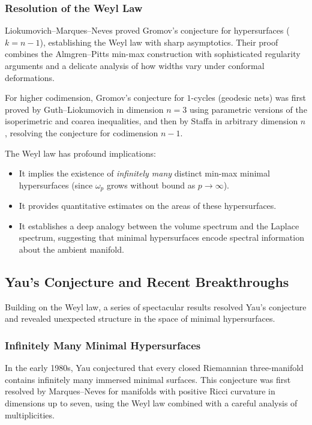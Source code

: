 \subsubsection{Resolution of the Weyl Law}

Liokumovich--Marques--Neves \cite{LMN} proved Gromov's conjecture for hypersurfaces ($k = n-1$),
establishing the Weyl law with sharp asymptotics. Their proof combines the Almgren--Pitts min-max
construction with sophisticated regularity arguments and a delicate analysis of how widths vary
under conformal deformations.

For higher codimension, Gromov's conjecture for $1$-cycles (geodesic nets) was first proved by
Guth--Liokumovich \cite{GL22} in dimension $n=3$ using parametric versions of the isoperimetric
and coarea inequalities, and then by Staffa \cite{Sta-Weyl,Sta-Coarea} in arbitrary dimension $n$,
resolving the conjecture for codimension $n-1$.

The Weyl law has profound implications:
\begin{itemize}
    \item It implies the existence of \emph{infinitely many} distinct min-max minimal hypersurfaces
    (since $\omega_p$ grows without bound as $p \to \infty$).

    \item It provides quantitative estimates on the areas of these hypersurfaces.

    \item It establishes a deep analogy between the volume spectrum and the Laplace spectrum,
    suggesting that minimal hypersurfaces encode spectral information about the ambient manifold.
\end{itemize}

\subsection{Yau's Conjecture and Recent Breakthroughs}

Building on the Weyl law, a series of spectacular results resolved Yau's conjecture and revealed
unexpected structure in the space of minimal hypersurfaces.

\subsubsection{Infinitely Many Minimal Hypersurfaces}

In the early 1980s, Yau conjectured that every closed Riemannian three-manifold contains infinitely
many immersed minimal surfaces. This conjecture was first resolved by Marques--Neves \cite{MN17}
for manifolds with positive Ricci curvature in dimensions up to seven, using the Weyl law combined
with a careful analysis of multiplicities.

